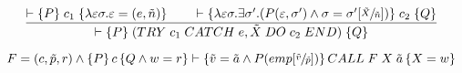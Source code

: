 \begin{equation}
\frac{\vdash \{P\} \; c_1 \; \{\lambda \varepsilon \sigma. \varepsilon = (e, \tilde{n})\} \qquad \vdash \{\lambda \varepsilon \sigma. \exists \sigma'. (P(\varepsilon, \sigma') \wedge \sigma = \sigma'[\sfrac{\tilde{X}}{\tilde{n}}])\} \; c_2 \; \{Q\}}{\vdash \{P\} \; (TRY\; c_1\; CATCH\; e, \tilde{X}\; DO\; c_2\; END) \; \{Q\}}
\end{equation}

\begin{equation}
F = (c,\tilde{p},r) \wedge \left\{P\right\} c \left\{Q \wedge w = r\right\} \vdash \left\{\tilde{v} = \tilde{a} \wedge P(emp[\sfrac{\tilde{v}}{\tilde{p}}])\right\}CALL \; F \; X \; \tilde{a} \left\{X = w\right\}
\end{equation}